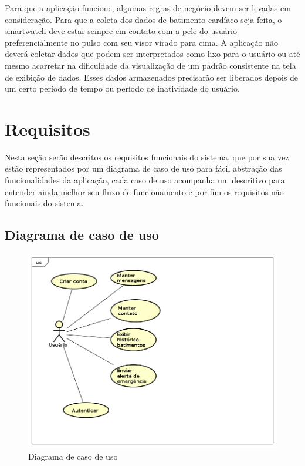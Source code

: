 \documentclass[
	12pt,				%
	openright,			%
	a4paper,			%
	oneside, 
	chapter=TITLE,		%
	english,			%
	brazil				%
	]{abntex2}
\begin{document}
Para que a aplicação funcione, algumas regras de negócio devem ser levadas em consideração. Para que a coleta dos dados de batimento cardíaco seja feita, o smartwatch deve estar sempre em contato com a pele do usuário preferencialmente no pulso com seu visor virado para cima. A aplicação não deverá coletar dados que podem ser interpretados como lixo para o usuário ou até mesmo acarretar na dificuldade da visualização de um padrão consistente na tela de exibição de dados. Esses dados armazenados precisarão ser liberados depois de um certo período de tempo ou período de inatividade do usuário.




\chapter{Requisitos}
Nesta seção serão descritos os requisitos funcionais do sistema, que por sua vez estão representados por um diagrama de caso de uso para fácil abstração das funcionalidades da aplicação, cada caso de uso acompanha um descritivo para entender ainda melhor seu fluxo de funcionamento e por fim os requisitos não funcionais do sistema.
\section{Diagrama de caso de uso}
\begin{figure}[h]
	\label{figure_diagrama_caso_uso}
	\caption{Diagrama de caso de uso} 
	\includegraphics[scale=0.6]{UseCase.png}
	\hfill
\end{figure}
\end{document}
